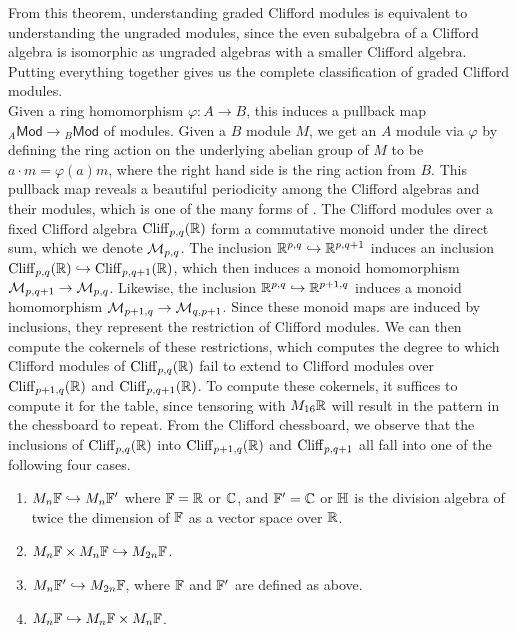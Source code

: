 %
From this theorem, understanding graded Clifford modules is equivalent to understanding
the ungraded modules, since the even subalgebra of a Clifford algebra is isomorphic
as ungraded algebras with a smaller Clifford algebra. Putting everything together
gives us the complete classification of graded Clifford modules.\\
%
Given a ring homomorphism $\varphi : A \to B$, this induces a pullback map
${}_A\mathsf{Mod} \to {}_B\mathsf{Mod}$ of modules. Given a $B$ module $M$,
we get an $A$ module via $\varphi$ by defining the ring action on the underlying
abelian group of $M$ to be $a \cdot m = \varphi(a)m$, where the right hand side
is the ring action from $B$. This pullback map reveals a beautiful periodicity
among the Clifford algebras and their modules, which is one of the many forms
of . The Clifford modules over a fixed Clifford algebra
$\operatorname{Cliff}_{p,q}(\mathbb{R})$ form a commutative monoid under the direct sum, which
we denote $\mathcal{M}_{p,q}$. The inclusion $\mathbb{R}^{p,q} \hookrightarrow \mathbb{R}^{p,q+1}$ induces
an inclusion $\operatorname{Cliff}_{p,q}(\mathbb{R}) \hookrightarrow \operatorname{Cliff}_{p,q+1}(\mathbb{R})$, which then
induces a monoid homomorphism $\mathcal{M}_{p,q+1} \to \mathcal{M}_{p,q}$. Likewise, the inclusion
$\mathbb{R}^{p,q}\hookrightarrow \mathbb{R}^{p+1,q}$ induces a monoid homomorphism
$\mathcal{M}_{p+1,q} \to \mathcal{M}_{q,p+1}$. Since these monoid maps are induced by
inclusions, they represent the restriction of Clifford modules. We can then
compute the cokernels of these restrictions, which computes the degree to
which Clifford modules of $\operatorname{Cliff}_{p,q}(\mathbb{R})$ fail to extend to Clifford modules
over $\operatorname{Cliff}_{p+1,q}(\mathbb{R})$ and $\operatorname{Cliff}_{p,q+1}(\mathbb{R})$. To compute these cokernels,
it suffices to compute it for the table, since tensoring with $M_{16}\mathbb{R}$ will
result in the pattern in the chessboard to repeat. From the Clifford chessboard,
we observe that the inclusions of $\operatorname{Cliff}_{p,q}(\mathbb{R})$ into $\operatorname{Cliff}_{p+1,q}(\mathbb{R})$
and $\operatorname{Cliff}_{p,q+1}$ all fall into one of the following four cases.
%
\begin{enumerate}
  \item $M_n\mathbb{F} \hookrightarrow M_n\mathbb{F}'$ where $\mathbb{F} = \mathbb{R}$ or $\mathbb{C}$, and $\mathbb{F}' = \mathbb{C}$
  or $\mathbb{H}$ is the division algebra of twice the dimension of $\mathbb{F}$ as a
  vector space over $\mathbb{R}$.
  \item $M_n\mathbb{F} \times M_n\mathbb{F} \hookrightarrow M_{2n}\mathbb{F}$.
  \item $M_n\mathbb{F}' \hookrightarrow M_{2n}\mathbb{F}$, where $\mathbb{F}$ and $\mathbb{F}'$ are defined as above.
  \item $M_n\mathbb{F} \hookrightarrow M_n\mathbb{F} \times M_n\mathbb{F}$.
\end{enumerate}
